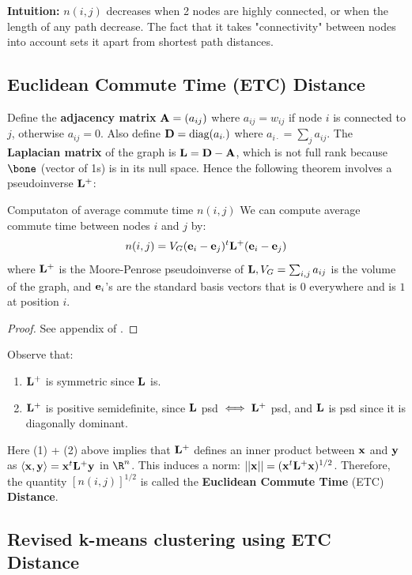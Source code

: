 \documentclass[./some_latex_template.tex]{subfiles}
\begin{document}
\noindent \textbf{Intuition:} $n(i, j)$ decreases when 2 nodes are highly connected, or when the length of any path decrease. The fact that it takes "connectivity" between nodes into account sets it apart from  shortest path distances.

\subsection{Euclidean Commute Time (ETC) Distance}

Define the \textbf{adjacency matrix} $\mathbf{A} = (a_{ij})$ where $a_{ij} = w_{ij}$ if node $i$ is connected to $j$, otherwise $a_{ij} = 0$. Also define $\mathbf{D} = \text{diag}(a_{i\cdot})$  where $a_{i\cdot} = \sum_{j}a_{ij}$. The \textbf{Laplacian matrix} of the graph is $\mathbf{L} = \mathbf{D} - \mathbf{A}$, which is not full rank because $\bone$ (vector of 1s) is in its null space. Hence the following theorem involves a pseudoinverse $\mathbf{L}^+$: 

\begin{theorembox}{Computaton of average commute time $n(i, j)$}{}
We can compute average commute time between nodes $i$ and $j$ by:
\begin{align*}
	n(i, j) = V_G (\mathbf{e}_i - \mathbf{e}_j)^t\mathbf{L}^+(\mathbf{e}_i - \mathbf{e}_j)
\end{align*}
where $\mathbf{L}^+$ is the Moore-Penrose pseudoinverse of $\mathbf{L}, V_G = \sum_{i,j} a_{ij}$ is the volume of the graph, and $\mathbf{e}_i$'s are the standard basis vectors that is $0$ everywhere and is $1$ at position $i$. 
\end{theorembox}
\begin{proof}
See appendix of \cite{fouss2007random}. 
\end{proof}

\noindent Observe that:
\begin{enumerate}
	\item $\mathbf{L}^+$ is symmetric since $\mathbf{L}$ is. 
	\item $\mathbf{L}^+$ is positive semidefinite, since $\mathbf{L}$ psd $\iff \mathbf{L}^+$ psd, and $\mathbf{L}$ is psd since it is diagonally dominant. 
\end{enumerate}

\noindent Here (1) + (2) above implies that $\mathbf{L}^+$ defines an inner product between $\mathbf{x}$ and $\mathbf{y}$ as $\langle\mathbf{x}, \mathbf{y}\rangle = \mathbf{x}^t\mathbf{L}^+\mathbf{y}$ in $\R^n$. This induces a norm: $||\mathbf{x}|| = (\mathbf{x}^t\mathbf{L}^+\mathbf{x})^{1/2}$. Therefore, the quantity $[n(i, j)]^{1/2}$ is called the \textbf{Euclidean Commute Time} (ETC) \textbf{Distance}. 

\subsection{Revised k-means clustering using ETC Distance}
\end{document}
